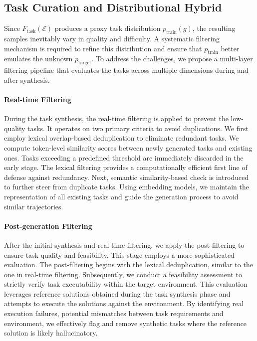 \subsection{Task Curation and Distributional Hybrid} \label{sec:task-curation}

Since $F_{\mathrm{task}}(\mathcal{E})$ produces a proxy task distribution $p_{\mathrm{train}}(g)$, the resulting samples inevitably vary in quality and difficulty. A systematic filtering mechanism is required to refine this distribution and ensure that $p_{\mathrm{train}}$ better emulates the unknown $p_{\mathrm{target}}$. To address the challenges, we propose a multi-layer filtering pipeline that evaluates the tasks across multiple dimensions during and after synthesis.

\paragraph{Real-time Filtering} During the task synthesis, the real-time filtering is applied to prevent the low-quality tasks. It operates on two primary criteria to avoid duplications. We first employ lexical overlap-based deduplication to eliminate redundant tasks. We compute token-level similarity scores between newly generated tasks and existing ones. Tasks exceeding a predefined threshold are immediately discarded in the early stage. The lexical filtering provides a computationally efficient first line of defense against redundancy. Next, semantic similarity-based check is introduced to further steer from duplicate tasks. Using embedding models, we maintain the representation of all existing tasks and guide the generation process to avoid similar trajectories.

\paragraph{Post-generation Filtering} After the initial synthesis and real-time filtering, we apply the post-filtering to ensure task quality and feasibility. This stage employs a more sophisticated evaluation. The post-filtering begins with the lexical deduplication, similar to the one in real-time filtering. Subsequently, we conduct a feasibility assessment to strictly verify task executability within the target environment. This evaluation leverages reference solutions obtained during the task synthesis phase and attempts to execute the solutions against the environment. By identifying real execution failures, potential mismatches between task requirements and environment, we effectively flag and remove synthetic tasks where the reference solution is likely hallucinatory.

